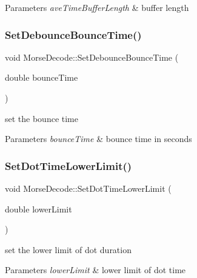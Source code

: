 \begin{DoxyParams}{Parameters}
{\em ave\+Time\+Buffer\+Length} & buffer length \\
\hline
\end{DoxyParams}
\mbox{\label{classMorseDecode_a2f5a27e26aa17b37f54fa5353ac02af8}} 
\subsubsection{\texorpdfstring{Set\+Debounce\+Bounce\+Time()}{SetDebounceBounceTime()}}
{\footnotesize\ttfamily void Morse\+Decode\+::\+Set\+Debounce\+Bounce\+Time (\begin{DoxyParamCaption}\item[{double}]{bounce\+Time }\end{DoxyParamCaption})}



set the bounce time 


\begin{DoxyParams}{Parameters}
{\em bounce\+Time} & bounce time in seconds \\
\hline
\end{DoxyParams}
\mbox{\label{classMorseDecode_a7ac2abe729dcd3cce8d53636e6a8c5b2}} 
\subsubsection{\texorpdfstring{Set\+Dot\+Time\+Lower\+Limit()}{SetDotTimeLowerLimit()}}
{\footnotesize\ttfamily void Morse\+Decode\+::\+Set\+Dot\+Time\+Lower\+Limit (\begin{DoxyParamCaption}\item[{double}]{lower\+Limit }\end{DoxyParamCaption})}



set the lower limit of dot duration 


\begin{DoxyParams}{Parameters}
{\em lower\+Limit} & lower limit of dot time \\
\hline
\end{DoxyParams}
\mbox{\label{classMorseDecode_af73b94d8c654642982a38f5aa0a70beb}} 
